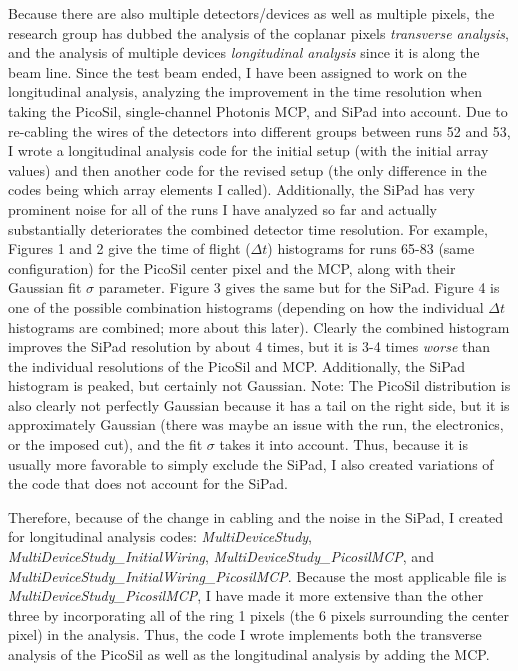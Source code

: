 \documentclass[12pt]{article}
\begin{document}
Because there are also multiple detectors/devices as well as multiple pixels, the research group has dubbed the analysis of the coplanar pixels \textit{transverse analysis}, and the analysis of multiple devices \textit{longitudinal analysis} since it is along the beam line. Since the test beam ended, I have been assigned to work on the longitudinal analysis, analyzing the improvement in the time resolution when taking the PicoSil, single-channel Photonis MCP, and SiPad into account. Due to re-cabling the wires of the detectors into different groups between runs 52 and 53, I wrote a longitudinal analysis code for the initial setup (with the initial array values) and then another code for the revised setup (the only difference in the codes being which array elements I called). Additionally, the SiPad has very prominent noise for all of the runs I have analyzed so far and actually substantially deteriorates the combined detector time resolution. For example, Figures 1 and 2 give the time of flight ($\Delta t$) histograms for runs 65-83 (same configuration) for the PicoSil center pixel and the MCP, along with their Gaussian fit $\sigma$ parameter. Figure 3 gives the same but for the SiPad. Figure 4 is one of the possible combination histograms (depending on how the individual $\Delta t$ histograms are combined; more about this later). Clearly the combined histogram improves the SiPad resolution by about 4 times, but it is 3-4 times \textit{worse} than the individual resolutions of the PicoSil and MCP. Additionally, the SiPad histogram is peaked, but certainly not Gaussian. Note: The PicoSil distribution is also clearly not perfectly Gaussian because it has a tail on the right side, but it is approximately Gaussian (there was maybe an issue with the run, the electronics, or the imposed cut), and the fit $\sigma$ takes it into account. Thus, because it is usually more favorable to simply exclude the SiPad, I also created variations of the code that does not account for the SiPad.


Therefore, because of the change in cabling and the noise in the SiPad, I created for longitudinal analysis codes: \textit{MultiDeviceStudy}, \textit{MultiDeviceStudy\_InitialWiring}, \textit{MultiDeviceStudy\_PicosilMCP}, and \textit{MultiDeviceStudy\_InitialWiring\_PicosilMCP}. Because the most applicable file is \textit{MultiDeviceStudy\_PicosilMCP}, I have made it more extensive than the other three by incorporating all of the ring 1 pixels (the 6 pixels surrounding the center pixel) in the analysis. Thus, the code I wrote implements both the transverse analysis of the PicoSil as well as the longitudinal analysis by adding the MCP.
\end{document}
